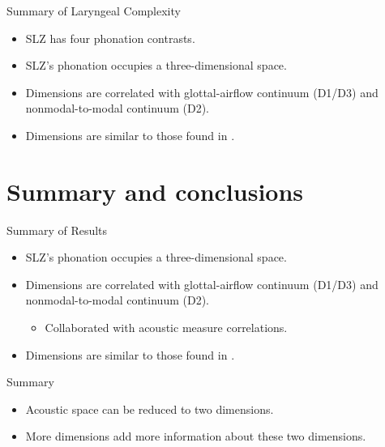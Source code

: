 \documentclass[professionalfont]{beamer}
\begin{document}
\begin{frame}{Summary of Laryngeal Complexity}
  \begin{itemize}
    \item SLZ has four phonation contrasts.
    \item SLZ's phonation occupies a three-dimensional space.
    \item Dimensions are correlated with glottal-airflow continuum (D1/D3) and nonmodal-to-modal continuum (D2).
    \item Dimensions are similar to those found in \citet{keatingCrosslanguageAcousticSpace2023}.
  \end{itemize}
\end{frame}

\section{Summary and conclusions}
\begin{frame}{Summary of Results}
  \begin{itemize}
    \item SLZ's phonation occupies a three-dimensional space.
    \item Dimensions are correlated with glottal-airflow continuum (D1/D3) and nonmodal-to-modal continuum (D2).
    \begin{itemize}
      \item Collaborated with acoustic measure correlations.
    \end{itemize}
    \item Dimensions are similar to those found in \citeauthor{keatingCrosslanguageAcousticSpace2023}.
  \end{itemize}
\end{frame}

\begin{frame}{Summary}
  \begin{itemize}
    \item Acoustic space can be reduced to two dimensions.
    \item More dimensions add more information about these two dimensions.
  \end{itemize}
  \begin{figure}[h!]
    \centering
\end{figure}
\end{frame}
\end{document}
